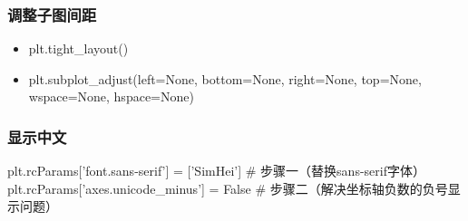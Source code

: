 \subsubsection{调整子图间距}
\begin{itemize}
	\item plt.tight\_layout()
	\item plt.subplot\_adjust(left=None, bottom=None, right=None, top=None, wspace=None, hspace=None)
\end{itemize}

\subsubsection{显示中文}
\begin{python}
	plt.rcParams['font.sans-serif'] = ['SimHei'] # 步骤一（替换sans-serif字体）  
	plt.rcParams['axes.unicode_minus'] = False  # 步骤二（解决坐标轴负数的负号显示问题）
\end{python}






